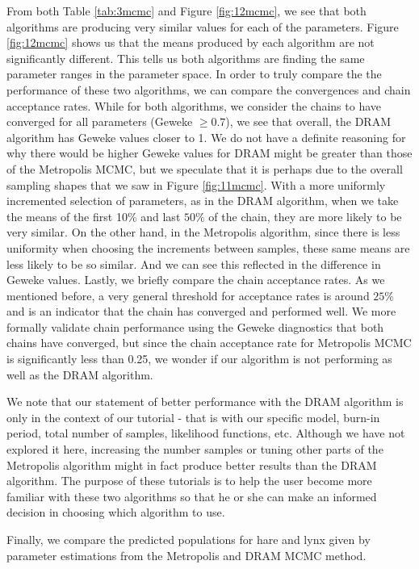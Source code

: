 From both Table \ref{tab:3mcmc} and Figure \ref{fig:12mcmc}, we see that both algorithms are producing very similar values for each of the parameters. Figure \ref{fig:12mcmc} shows us that the means produced by each algorithm are not significantly different. This tells us both algorithms are finding the same parameter ranges in the parameter space. In order to truly compare the the performance of these two algorithms, we can compare the convergences and chain acceptance rates. While for both algorithms, we consider the chains to have converged for all parameters (Geweke $\geq 0.7$), we see that overall, the DRAM algorithm has Geweke values closer to 1. We do not have a definite reasoning for why there would be higher Geweke values for DRAM might be greater than those of the Metropolis MCMC, but we speculate that it is perhaps due to the overall sampling shapes that we saw in Figure \ref{fig:11mcmc}. With a more uniformly incremented selection of parameters, as in the DRAM algorithm, when we take the means of the first 10$\%$ and last $50\%$ of the chain, they are more likely to be very similar. On the other hand, in the Metropolis algorithm, since there is less uniformity when choosing the increments between samples, these same means are less likely to be so similar. And we can see this reflected in the difference in Geweke values. Lastly, we briefly compare the chain acceptance rates. As we mentioned before, a very general threshold for acceptance rates is around $25\%$ and is an indicator that the chain has converged and performed well. We more formally validate chain performance using the Geweke diagnostics that both chains have converged, but since the chain acceptance rate for Metropolis MCMC is significantly less than 0.25, we wonder if our algorithm is not performing as well as the DRAM algorithm.
\par We note that our statement of better performance with the DRAM algorithm is only in the context of our tutorial - that is with our specific model, burn-in period, total number of samples, likelihood functions, etc. Although we have not explored it here, increasing the number samples or tuning other parts of the Metropolis algorithm might in fact produce better results than the DRAM algorithm. The purpose of these tutorials is to help the user become more familiar with these two algorithms so that he or she can make an informed decision in choosing which algorithm to use.
\par Finally, we compare the predicted populations for hare and lynx given by parameter estimations from the Metropolis and DRAM MCMC method.
